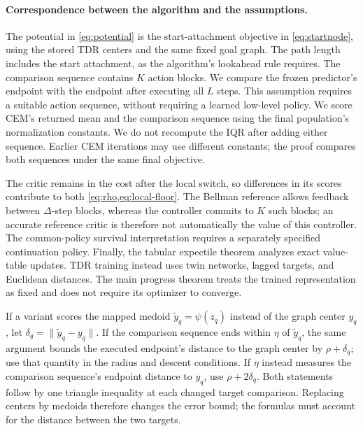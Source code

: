 \documentclass{article} %
\theoremstyle{definition}
\theoremstyle{remark}
\begin{document}
\paragraph{Correspondence between the algorithm and the assumptions.}
The potential in \cref{eq:potential} is the start-attachment objective in
\cref{eq:startnode}, using the stored TDR centers and the same fixed goal graph.
The path length includes the start attachment, as the algorithm's lookahead rule requires.
The comparison sequence contains $K$ action blocks. We compare the frozen predictor's
endpoint with the endpoint after executing all $L$ steps. This assumption requires a
suitable action sequence, without requiring a learned low-level policy.
We score CEM's returned mean and the comparison sequence using the final population's
normalization constants. We do not recompute the IQR after adding either sequence.
Earlier CEM iterations may use different constants; the proof compares both sequences
under the same final objective.

The critic remains in the cost after the local switch, so differences in its scores contribute
to both \cref{eq:rho,eq:local-floor}. The Bellman reference allows feedback between
$\Delta$-step blocks, whereas the controller commits to $K$ such blocks; an accurate
reference critic is therefore not automatically the value of this controller.
The common-policy survival interpretation requires a separately specified continuation
policy. Finally, the tabular expectile theorem analyzes exact value-table updates.
TDR training instead uses twin networks, lagged targets, and Euclidean distances.
The main progress theorem treats the trained representation as fixed and does not
require its optimizer to converge.

If a variant scores the mapped medoid $\tilde y_q=\psi(z_q)$ instead of the graph
center $y_q$, let $\delta_q=\|\tilde y_q-y_q\|$.
If the comparison sequence ends within $\eta$ of $\tilde y_q$, the same argument bounds
the executed endpoint's distance to the graph center by $\rho+\delta_q$; use that
quantity in the radius and descent conditions. If $\eta$ instead measures the
comparison sequence's endpoint distance to $y_q$, use $\rho+2\delta_q$.
Both statements follow by one triangle inequality at each changed target comparison.
Replacing centers by medoids therefore changes the error bound; the formulas must
account for the distance between the two targets.
\end{document}
